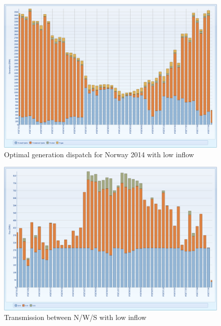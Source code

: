 \documentclass{article}
\begin{document}
\begin{figure}[htbp]
\begin{center}
\includegraphics[width=13cm,keepaspectratio=true]{figures/drycase/MTgenerationNdry}
\caption{Optimal generation dispatch for Norway 2014 with low inflow}
\label{fig:MTgenerationNdry}
\end{center}
\end{figure}
\begin{figure}[htbp]
\begin{center}
\includegraphics[width=13cm,keepaspectratio=true]{figures/drycase/MTnodetransmissiondry}
\caption{Transmission between N/W/S with low inflow}
\label{fig:MTnodetransmissiondry}
\end{center}
\end{figure}
\end{document}
